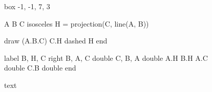 \documentclass{article}
\begin{document}
	\begin{figure}[h]
	\centering
	\caption{text}
	\begin{eukleides}
		box -1, -1, 7, 3
		
		A B C isosceles
		H = projection(C, line(A, B))
		
		draw
			(A.B.C)
			C.H dashed
			H
		end
		
		label
			B, H, C right
			B, A, C double
			C, B, A double
			A.H
			B.H
			A.C double
			C.B double
		end
	\end{eukleides}
	\end{figure}
\end{document}
